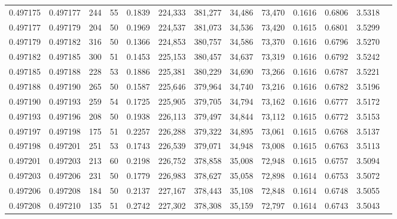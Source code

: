 \begin{tabular}{rrrrrrrrrrrrr}
0.497175 & 0.497177 & 244 &  55 &                                     0.1839 & 224,333 & 381,277 &  34,486 &  73,470 & 0.1616 & 0.6806 & 3.5318 \\
0.497177 & 0.497179 & 204 &  50 &                                     0.1969 & 224,537 & 381,073 &  34,536 &  73,420 & 0.1615 & 0.6801 & 3.5299 \\
0.497179 & 0.497182 & 316 &  50 &                                     0.1366 & 224,853 & 380,757 &  34,586 &  73,370 & 0.1616 & 0.6796 & 3.5270 \\
0.497182 & 0.497185 & 300 &  51 &                                     0.1453 & 225,153 & 380,457 &  34,637 &  73,319 & 0.1616 & 0.6792 & 3.5242 \\
0.497185 & 0.497188 & 228 &  53 &                                     0.1886 & 225,381 & 380,229 &  34,690 &  73,266 & 0.1616 & 0.6787 & 3.5221 \\
0.497188 & 0.497190 & 265 &  50 &                                     0.1587 & 225,646 & 379,964 &  34,740 &  73,216 & 0.1616 & 0.6782 & 3.5196 \\
0.497190 & 0.497193 & 259 &  54 &                                     0.1725 & 225,905 & 379,705 &  34,794 &  73,162 & 0.1616 & 0.6777 & 3.5172 \\
0.497193 & 0.497196 & 208 &  50 &                                     0.1938 & 226,113 & 379,497 &  34,844 &  73,112 & 0.1615 & 0.6772 & 3.5153 \\
0.497197 & 0.497198 & 175 &  51 &                                     0.2257 & 226,288 & 379,322 &  34,895 &  73,061 & 0.1615 & 0.6768 & 3.5137 \\
0.497198 & 0.497201 & 251 &  53 &                                     0.1743 & 226,539 & 379,071 &  34,948 &  73,008 & 0.1615 & 0.6763 & 3.5113 \\
0.497201 & 0.497203 & 213 &  60 &                                     0.2198 & 226,752 & 378,858 &  35,008 &  72,948 & 0.1615 & 0.6757 & 3.5094 \\
0.497203 & 0.497206 & 231 &  50 &                                     0.1779 & 226,983 & 378,627 &  35,058 &  72,898 & 0.1614 & 0.6753 & 3.5072 \\
0.497206 & 0.497208 & 184 &  50 &                                     0.2137 & 227,167 & 378,443 &  35,108 &  72,848 & 0.1614 & 0.6748 & 3.5055 \\
0.497208 & 0.497210 & 135 &  51 &                                     0.2742 & 227,302 & 378,308 &  35,159 &  72,797 & 0.1614 & 0.6743 & 3.5043 \\

\end{tabular}
